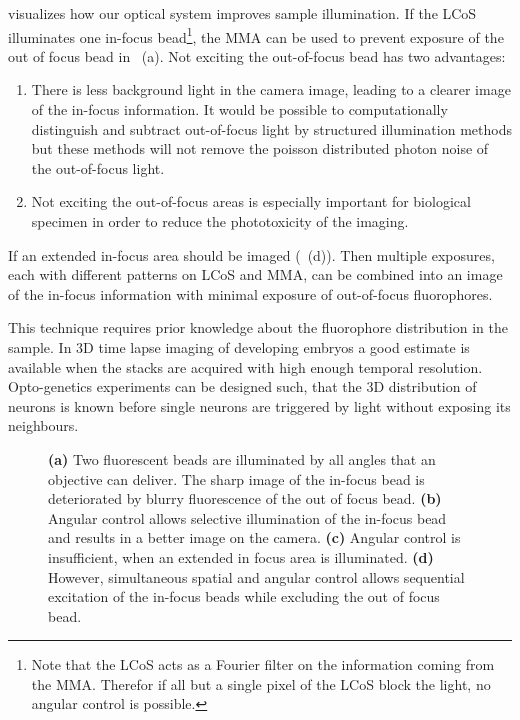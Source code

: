  visualizes how our optical system improves
sample illumination. If the LCoS illuminates one in-focus
bead\footnote{Note that the LCoS acts as a Fourier filter on the
  information coming from the MMA. Therefor if all but a single pixel
  of the LCoS block the light, no angular control is possible.}, the
MMA can be used to prevent exposure of the out of focus bead in
~(a). Not exciting the out-of-focus bead has
two advantages:
\begin{enumerate}
\item There is less background light in the camera image, leading to a
  clearer image of the in-focus information. It would be possible to
  computationally distinguish and subtract out-of-focus light by
  structured illumination methods but these methods will not remove
  the poisson distributed photon noise of the out-of-focus light.
\item Not exciting the out-of-focus areas is especially important for
  biological specimen in order to reduce the phototoxicity of the
  imaging.
\end{enumerate}
If an extended in-focus area should be imaged
(~(d)). Then multiple exposures, each with
different patterns on LCoS and MMA, can be combined into an image of
the in-focus information with minimal exposure of out-of-focus
fluorophores.

This technique requires prior knowledge about the fluorophore
distribution in the sample. In 3D time lapse imaging of developing
embryos a good estimate is available when the stacks are acquired with
high enough temporal resolution. Opto-genetics experiments can be
designed such, that the 3D distribution of neurons is known before
single neurons are triggered by light without exposing its neighbours.

\begin{figure}[!hbt]
  \centering
  \def\svgscale{.43}
  
  \caption{{\bf (a)} Two fluorescent beads are illuminated by all
    angles that an objective can deliver. The sharp image of the
    in-focus bead is deteriorated by blurry fluorescence of the out of
    focus bead. {\bf (b)} Angular control allows selective
    illumination of the in-focus bead and results in a better image on
    the camera. {\bf (c)} Angular control is insufficient, when an
    extended in focus area is illuminated. {\bf (d)} However,
    simultaneous spatial and angular control allows sequential
    excitation of the in-focus beads while excluding the out of focus
    bead.}
  \label{fig:hourglass-all}
\end{figure}

